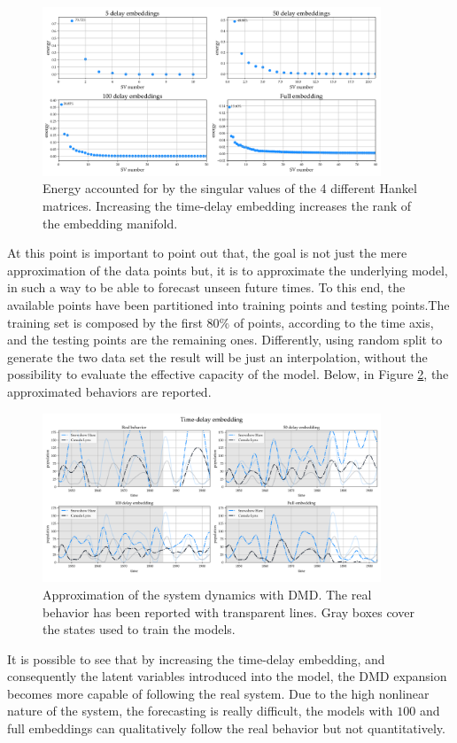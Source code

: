 \documentclass[]{article}
\begin{document}
\begin{figure}[!b]
\centering
\includegraphics[width=0.9\textwidth]{../figures/td_energy.png}
\caption{Energy accounted for by the singular values of the 4 different Hankel matrices. Increasing the time-delay embedding increases the rank of the embedding manifold.}
\label{fig:fig2}
\end{figure}
At this point is important to point out that, the goal is not just the mere approximation of the data points but, it is to approximate the underlying model, in such a way to be able to forecast unseen future times. To this end, the available points have been partitioned into training points and testing points.The training set is composed by the first $80\%$ of points, according to the time axis, and the testing points are the remaining ones. Differently, using random split to generate the two data set the result will be just an interpolation, without the possibility to evaluate the effective capacity of the model. Below, in Figure \ref{fig:fig3}, the approximated behaviors are reported.
\begin{figure}[!t]
\centering
\includegraphics[width=0.9\textwidth]{../figures/td_dmd.png}
\caption{Approximation of the system dynamics with DMD. The real behavior has been reported with transparent lines. Gray boxes cover the states used to train the models.}
\label{fig:fig3}
\end{figure}
It is possible to see that by increasing the time-delay embedding, and consequently the latent variables introduced into the model, the DMD expansion becomes more capable of following the real system. Due to the high nonlinear nature of the system, the forecasting is really difficult, the models with $100$ and full embeddings can qualitatively follow the real behavior but not quantitatively. 
\end{document}
